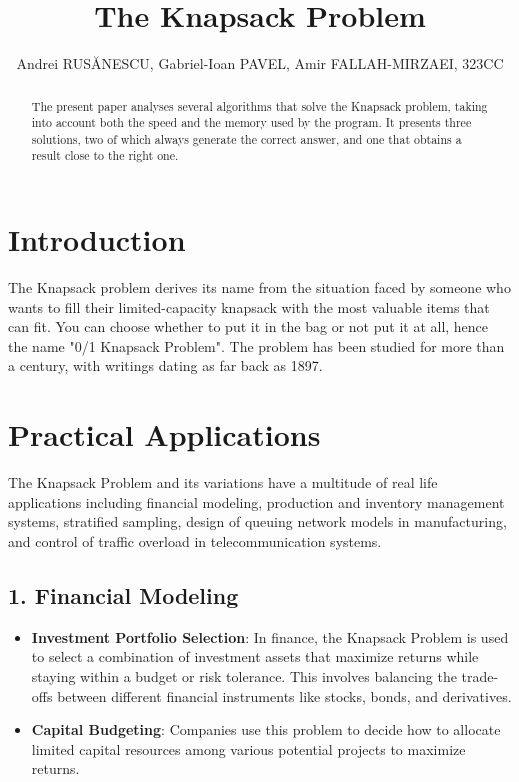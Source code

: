 \documentclass{llncs}
\begin{document}
%
\title{The Knapsack Problem}
%
%
\author{Andrei RUSĂNESCU,
Gabriel-Ioan PAVEL,
Amir FALLAH-MIRZAEI,
323CC}
%
%
\maketitle              %
%
\begin{abstract}
The present paper analyses several algorithms that solve the Knapsack problem,
taking into account both the speed and the memory used by the program. It
presents three solutions, two of which always generate the correct answer, and
one that obtains a result close to the right one.

\end{abstract}
%
%
%
\section{Introduction}
The Knapsack problem derives its name from the situation faced by someone who wants
to fill their limited-capacity knapsack with the most valuable items that can fit.
You can choose whether to put it in the bag or not put it at all, hence the name
"0/1 Knapsack Problem". The problem has been studied for more than a century, with
writings dating as far back as 1897. 

\section{Practical Applications}
The Knapsack Problem and its variations have a multitude of real life applications
including financial modeling, production and inventory management systems, stratified
sampling, design of queuing network models in manufacturing, and control of traffic
overload in telecommunication systems.

\subsection*{1. Financial Modeling}
\begin{itemize}
    \item \textbf{Investment Portfolio Selection}: In finance, the Knapsack Problem
        is used to select a combination of investment assets that maximize returns while
        staying within a budget or risk tolerance. This involves balancing the trade-offs
        between different financial instruments like stocks, bonds, and derivatives.
    \item \textbf{Capital Budgeting}: Companies use this problem to decide how to
        allocate limited capital resources among various potential projects to maximize returns.
\end{itemize}
\end{document}
